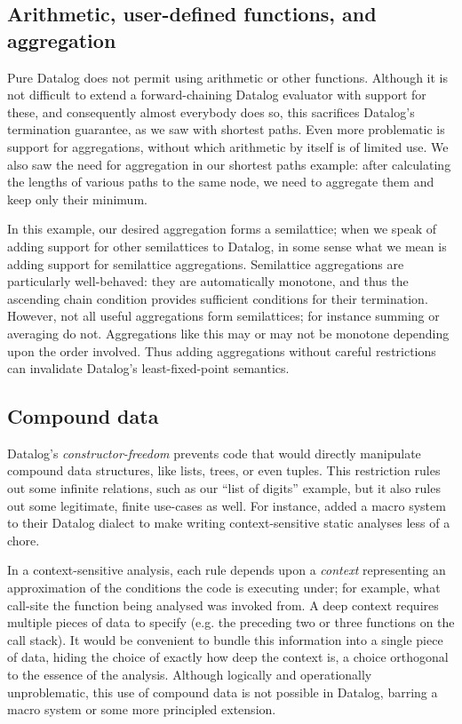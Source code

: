 
\subsection{Arithmetic, user-defined functions, and aggregation}

Pure Datalog does not permit using arithmetic or other functions.
%
Although it is not difficult to extend a forward-chaining Datalog evaluator with support for these, and consequently almost everybody does so, this sacrifices Datalog's termination guarantee, as we saw with shortest paths.
%
Even more problematic is support for aggregations, without which arithmetic by itself is of limited use.
%
We also saw the need for aggregation in our shortest paths example: after calculating the lengths of various paths to the same node, we need to aggregate them and keep only their minimum.

In this example, our desired aggregation forms a semilattice; when we speak of adding support for other semilattices to Datalog, in some sense what we mean is adding support for semilattice aggregations.
%
Semilattice aggregations are particularly well-behaved: they are automatically monotone, and thus the ascending chain condition provides sufficient conditions for their termination.
%
However, not all useful aggregations form semilattices; for instance summing or averaging do not.
%
Aggregations like this may or may not be monotone depending upon the order involved. Thus adding aggregations without careful restrictions can invalidate Datalog's least-fixed-point semantics.


\subsection{Compound data}

Datalog's \emph{constructor-freedom} prevents code that would directly
manipulate compound data structures, like lists, trees, or even tuples. This
restriction rules out some infinite relations, such as our ``list of digits''
example, but it also rules out some legitimate, finite use-cases as well.
%
For instance, \citet{DBLP:conf/datalog/SmaragdakisB10} added a macro system to
their Datalog dialect to make writing context-sensitive static analyses less of
a chore.

In a context-sensitive analysis, each rule depends upon a \emph{context} representing an approximation of the conditions the code is executing under; for example, what call-site the function being analysed was invoked from.
%
A deep context requires multiple pieces of data to specify (e.g. the preceding
two or three functions on the call stack).
%
It would be convenient to bundle this information into a single piece of data,
hiding the choice of exactly how deep the context is, a choice orthogonal to the
essence of the analysis.
%
Although logically and operationally unproblematic, this use of compound data is
not possible in Datalog, barring a macro system or some more principled
extension.

